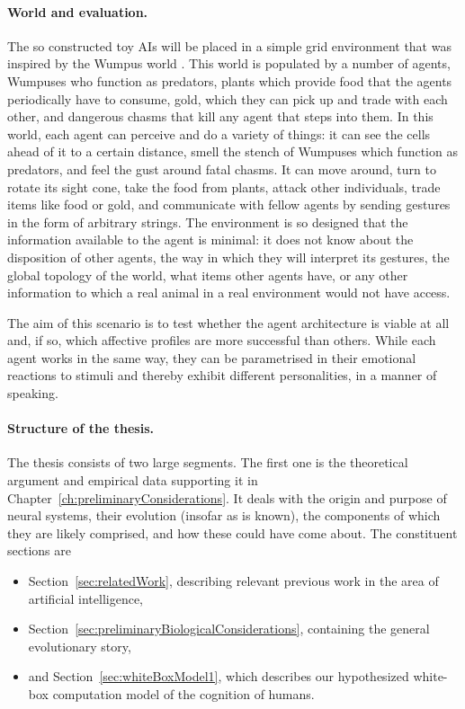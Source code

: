 \paragraph{World and evaluation.} The so constructed toy AIs will be placed in a simple grid environment that was inspired by the Wumpus world \cite{norvig}. This world is populated by a number of agents, Wumpuses who function as predators, plants which provide food that the agents periodically have to consume, gold, which they can pick up and trade with each other, and dangerous chasms that kill any agent that steps into them. In this world, each agent can perceive and do a variety of things: it can see the cells ahead of it to a certain distance, smell the stench of Wumpuses which function as predators, and feel the gust around fatal chasms. It can move around, turn to rotate its sight cone, take the food from plants, attack other individuals, trade items like food or gold, and communicate with fellow agents by sending gestures in the form of arbitrary strings. The environment is so designed that the information available to the agent is minimal: it does not know about the disposition of other agents, the way in which they will interpret its gestures, the global topology of the world, what items other agents have, or any other information to which a real animal in a real environment would not have access.

The aim of this scenario is to test whether the agent architecture is viable at all and, if so, which affective profiles are more successful than others. While each agent works in the same way, they can be parametrised in their emotional reactions to stimuli and thereby exhibit different personalities, in a manner of speaking. 

\paragraph{Structure of the thesis.} The thesis consists of two large segments. The first one is the theoretical argument and empirical data supporting it in Chapter~\ref{ch:preliminaryConsiderations}. It deals with the origin and purpose of neural systems, their evolution (insofar as is known), the components of which they are likely comprised, and how these could have come about. The constituent sections are
	\begin{itemize}
		\item Section~\ref{sec:relatedWork}, describing relevant previous work in the area of artificial intelligence,
		\item Section~\ref{sec:preliminaryBiologicalConsiderations}, containing the general evolutionary story,
		\item and Section~\ref{sec:whiteBoxModel1}, which describes our hypothesized white-box computation model of the cognition of humans.
	\end{itemize}

